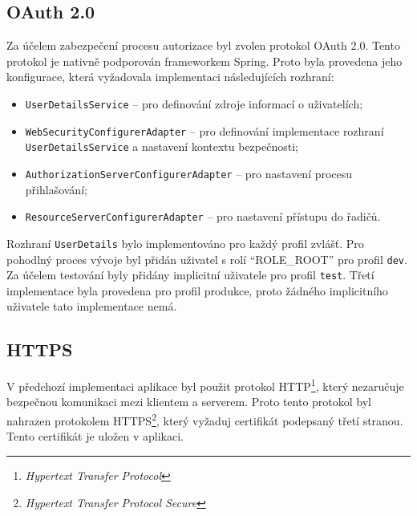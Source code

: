     \subsection{OAuth 2.0}
        Za účelem zabezpečení procesu autorizace byl zvolen protokol OAuth 2.0. Tento protokol je nativně podporován frameworkem Spring. Proto byla provedena jeho konfigurace, která vyžadovala implementaci následujících rozhraní:
        \begin{itemize}
            \item \texttt{UserDetailsService} -- pro definování zdroje informací o uživatelích;
            \item \texttt{WebSecurityConfigurerAdapter} -- pro definování implementace rozhraní \texttt{UserDetailsService} a nastavení kontextu bezpečnosti;
            \item \texttt{AuthorizationServerConfigurerAdapter} -- pro nastavení procesu přihlašování;
            \item \texttt{ResourceServerConfigurerAdapter} -- pro nastavení přístupu do řadičů.
        \end{itemize}
        
        Rozhraní \verb|UserDetails| bylo implementováno pro každý profil zvlášť. Pro pohodlný proces vývoje byl přidán uživatel s rolí \enquote{ROLE\_ROOT} pro profil \verb|dev|. Za účelem testování byly přidány implicitní uživatele pro profil \verb|test|. Třetí implementace byla provedena pro profil produkce, proto žádného implicitního uživatele tato implementace nemá.
        
    \subsection{HTTPS}
        V předchozí implementaci aplikace byl použit protokol HTTP\footnote{\textit{Hypertext Transfer Protocol}}, který nezaručuje bezpečnou komunikaci mezi klientem a serverem. Proto tento protokol byl nahrazen protokolem HTTPS\footnote{\textit{Hypertext Transfer Protocol Secure}}, který vyžaduj certifikát podepsaný třetí stranou. Tento certifikát je uložen v aplikaci.
        
